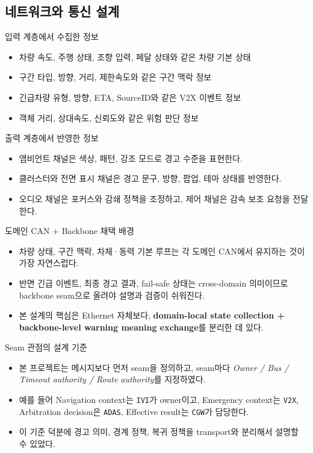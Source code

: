 \documentclass[aspectratio=169,10pt]{beamer}
\begin{document}
\subsection{네트워크와 통신 설계}
\begin{frame}{입력 계층에서 수집한 정보}
\begin{itemize}
  \item 차량 속도, 주행 상태, 조향 입력, 페달 상태와 같은 차량 기본 상태
  \item 구간 타입, 방향, 거리, 제한속도와 같은 구간 맥락 정보
  \item 긴급차량 유형, 방향, ETA, SourceID와 같은 V2X 이벤트 정보
  \item 객체 거리, 상대속도, 신뢰도와 같은 위험 판단 정보
\end{itemize}
\end{frame}

\begin{frame}{출력 계층에서 반영한 정보}
\begin{itemize}
  \item 앰비언트 채널은 색상, 패턴, 강조 모드로 경고 수준을 표현한다.
  \item 클러스터와 전면 표시 채널은 경고 문구, 방향, 팝업, 테마 상태를 반영한다.
  \item 오디오 채널은 포커스와 감쇄 정책을 조정하고, 제어 채널은 감속 보조 요청을 전달한다.
\end{itemize}
\end{frame}

\begin{frame}{도메인 CAN + Backbone 채택 배경}
\begin{itemize}
  \item 차량 상태, 구간 맥락, 차체·동력 기본 루프는 각 도메인 CAN에서 유지하는 것이 가장 자연스럽다.
  \item 반면 긴급 이벤트, 최종 경고 결과, fail-safe 상태는 cross-domain 의미이므로 backbone seam으로 올려야 설명과 검증이 쉬워진다.
  \item 본 설계의 핵심은 Ethernet 자체보다, \textbf{domain-local state collection + backbone-level warning meaning exchange}를 분리한 데 있다.
\end{itemize}
\end{frame}

\begin{frame}{Seam 관점의 설계 기준}
\begin{itemize}
  \item 본 프로젝트는 메시지보다 먼저 seam을 정의하고, seam마다 \textit{Owner / Bus / Timeout authority / Route authority}를 지정하였다.
  \item 예를 들어 Navigation context는 \texttt{IVI}가 owner이고, Emergency context는 \texttt{V2X}, Arbitration decision은 \texttt{ADAS}, Effective result는 \texttt{CGW}가 담당한다.
  \item 이 기준 덕분에 경고 의미, 경계 정책, 복귀 정책을 transport와 분리해서 설명할 수 있었다.
\end{itemize}
\end{frame}
\end{document}
